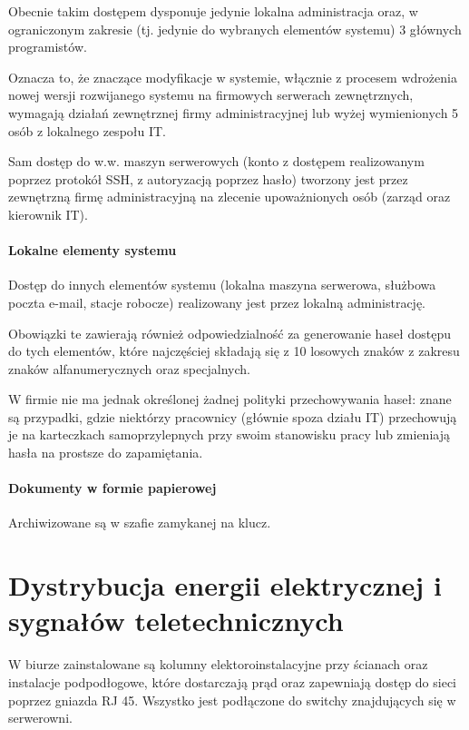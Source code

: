 \documentclass{article}
\begin{document}
            Obecnie takim dostępem dysponuje jedynie lokalna administracja oraz, w ograniczonym zakresie (tj. jedynie do wybranych elementów systemu) 3 głównych programistów.

            Oznacza to, że znaczące modyfikacje w systemie, włącznie z procesem wdrożenia nowej wersji rozwijanego systemu na firmowych serwerach zewnętrznych, wymagają działań zewnętrznej firmy administracyjnej lub wyżej wymienionych 5 osób z lokalnego zespołu IT.

            Sam dostęp do w.w. maszyn serwerowych (konto z dostępem realizowanym poprzez protokół SSH, z autoryzacją poprzez hasło) tworzony jest przez zewnętrzną firmę administracyjną na zlecenie upoważnionych osób (zarząd oraz kierownik IT).

            \paragraph{Lokalne elementy systemu}
            Dostęp do innych elementów systemu (lokalna maszyna serwerowa, służbowa poczta e-mail, stacje robocze) realizowany jest przez lokalną administrację.

            Obowiązki te zawierają również odpowiedzialność za generowanie haseł dostępu do tych elementów, które najczęściej składają się z 10 losowych znaków z zakresu znaków alfanumerycznych oraz specjalnych.

            W firmie nie ma jednak określonej żadnej polityki przechowywania haseł: znane są przypadki, gdzie niektórzy pracownicy (głównie spoza działu IT) przechowują je na karteczkach samoprzylepnych przy swoim stanowisku pracy lub zmieniają hasła na prostsze do zapamiętania.

            \paragraph{Dokumenty w formie papierowej}
            Archiwizowane są w szafie zamykanej na klucz.
            
        \section{Dystrybucja energii elektrycznej i sygnałów teletechnicznych}
            W biurze zainstalowane są kolumny elektoroinstalacyjne przy ścianach oraz instalacje podpodłogowe, które dostarczają prąd oraz zapewniają dostęp do sieci poprzez gniazda RJ 45. Wszystko jest podłączone do switchy znajdujących się w serwerowni.
\end{document}
